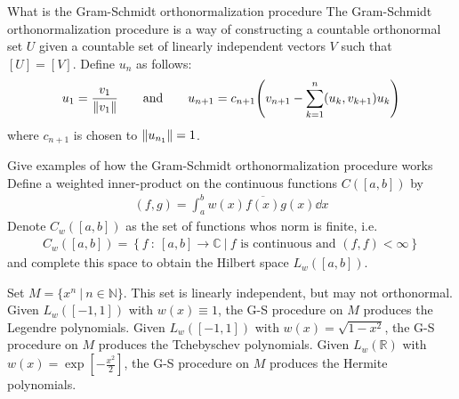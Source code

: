 \documentclass[avery5388,grid,frame]{flashcards}
\def\Rl{\mathbb{R}}
\def\Cx{\mathbb{C}}
\begin{document}
\begin{flashcard}
    {What is the Gram-Schmidt orthonormalization procedure}
    The Gram-Schmidt orthonormalization procedure is a way of constructing a countable orthonormal set $U$ given a countable set of linearly independent vectors $V$ such that $[U] = [V]$.  Define $u_n$ as follows:
    \begin{align*}
        u_1 = \frac{v_1}{\norm{v_1}} \qquad \text{and} \qquad u_{n+1} = c_{n+1}\qty(v_{n+1} - \sum_{k=1}^n (u_k,v_{k+1})u_k)
    \end{align*}
    where $c_{n+1}$ is chosen to $\norm{u_{n_1}} = 1$.
\end{flashcard}

\begin{flashcard}
    {Give examples of how the Gram-Schmidt orthonormalization procedure works}
    Define a weighted inner-product on the continuous functions $C([a,b])$ by
    \begin{align*}
        (f,g) = \int_a^b w(x)\overline{f(x)}g(x)\dd x
    \end{align*}
    Denote $C_w([a,b])$ as the set of functions whos norm is finite, i.e.
    \begin{align*}
        C_w([a,b]) = \left\{f\ :\ [a,b] \rightarrow \Cx\ |\ f \text{ is continuous and } (f,f) < \infty\right\}
    \end{align*}
    and complete this space to obtain the Hilbert space $L_w([a,b])$.

    Set $M = \{x^n\ |\ n \in \mathbb{N}\}$.  This set is linearly independent, but may not orthonormal.  Given $L_w([-1,1])$ with $w(x) \equiv 1$, the G-S procedure on $M$ produces the Legendre polynomials.  Given $L_w([-1,1])$ with $w(x) = \sqrt{1 - x^2}$, the G-S procedure on $M$ produces the Tchebyschev polynomials.  Given $L_w(\Rl)$ with $w(x) = \exp[-\frac{x^2}{2}]$, the G-S procedure on $M$ produces the Hermite polynomials.
\end{flashcard}
\end{document}

